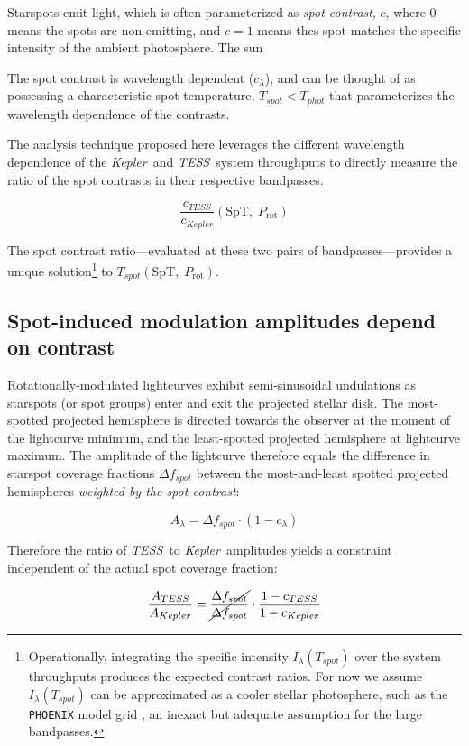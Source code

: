 \documentclass[letterpaper,11pt]{article}
\newcommand{\tess}{{\it TESS}}
\newcommand{\kepler}{{\it Kepler}}
\begin{document}
Starspots emit light, which is often parameterized as \emph{spot contrast}, $c$, where 0 means the spots are non-emitting, and $c=1$ means thes spot matches the specific intensity of the ambient photosphere.  The sun

The spot contrast is wavelength dependent ($c_\lambda$), and can be thought of as possessing a characteristic spot temperature, $T_{spot}<T_{phot}$ that parameterizes the wavelength dependence of the contrasts.

The analysis technique proposed here leverages the different wavelength dependence of the \kepler\ and \tess\ system throughputs to directly measure the ratio of the spot contrasts in their respective bandpasses.

$$\frac{c_{TESS}}{c_{Kepler}}(\mathrm{SpT},\;P_{\mathrm{rot}})$$

The spot contrast ratio---evaluated at these two pairs of bandpasses---provides a unique solution\footnote{Operationally, integrating the specific intensity $I_\lambda(T_{spot})$ over the system throughputs produces the expected contrast ratios.  For now we assume $I_\lambda(T_{spot})$ can be approximated as a cooler stellar photosphere, such as the \texttt{PHOENIX} model grid \citep{2013A&A...553A...6H}, an inexact but adequate assumption for the large bandpasses.} to $T_{spot}(\mathrm{SpT},\;P_{\mathrm{rot}})$.

\subsection{Spot-induced modulation amplitudes depend on contrast}
Rotationally-modulated lightcurves exhibit semi-sinusoidal undulations as starspots (or spot groups) enter and exit the projected stellar disk.  The most-spotted projected hemisphere is directed towards the observer at the moment of the lightcurve minimum, and the least-spotted projected hemisphere at lightcurve maximum.  The amplitude of the lightcurve therefore equals the difference in starspot coverage fractions $\Delta f_{spot}$ between the most-and-least spotted projected hemispheres \emph{weighted by the spot contrast}:

$$ A_\lambda = \Delta f_{spot} \cdot (1-c_\lambda)$$

Therefore the ratio of \tess\ to \kepler\ amplitudes yields a constraint independent of the actual spot coverage fraction:

$$ \frac{A_{TESS}}{A_{Kepler}} = \cancel{\frac{\Delta f_{spot}}{\Delta f_{spot}}} \cdot \frac{1-c_{TESS}}{1-c_{Kepler}} $$
\end{document}
